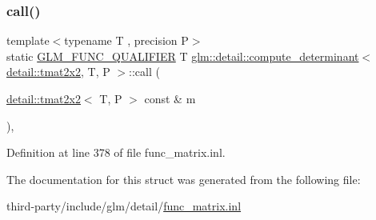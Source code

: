 \subsubsection{\texorpdfstring{call()}{call()}}
{\footnotesize\ttfamily template$<$typename T , precision P$>$ \\
static \hyperlink{setup_8hpp_a33fdea6f91c5f834105f7415e2a64407}{G\+L\+M\+\_\+\+F\+U\+N\+C\+\_\+\+Q\+U\+A\+L\+I\+F\+I\+ER} T \hyperlink{structglm_1_1detail_1_1compute__determinant}{glm\+::detail\+::compute\+\_\+determinant}$<$ \hyperlink{structglm_1_1detail_1_1tmat2x2}{detail\+::tmat2x2}, T, P $>$\+::call (\begin{DoxyParamCaption}\item[{\hyperlink{structglm_1_1detail_1_1tmat2x2}{detail\+::tmat2x2}$<$ T, P $>$ const \&}]{m }\end{DoxyParamCaption})\hspace{0.3cm}{\ttfamily [inline]}, {\ttfamily [static]}}



Definition at line 378 of file func\+\_\+matrix.\+inl.



The documentation for this struct was generated from the following file\+:\begin{DoxyCompactItemize}
\item 
third-\/party/include/glm/detail/\hyperlink{func__matrix_8inl}{func\+\_\+matrix.\+inl}\end{DoxyCompactItemize}
